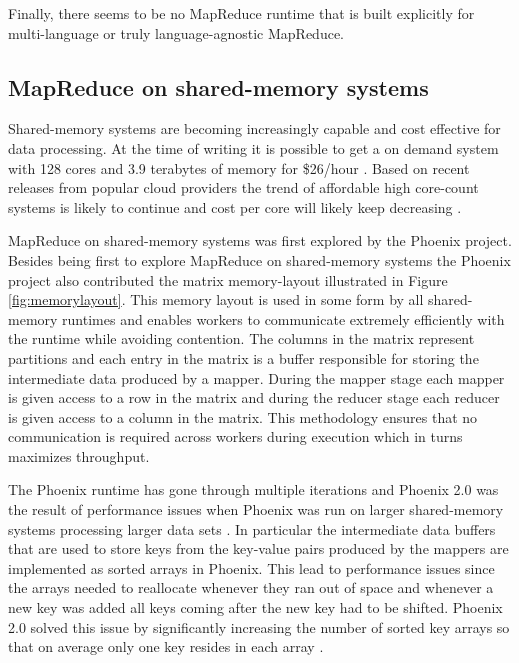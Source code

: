 \documentclass[11pt]{article}       %
\begin{document}
Finally, there seems to be no MapReduce runtime that is built explicitly for multi-language or truly language-agnostic MapReduce.

\subsection{MapReduce on shared-memory systems}

Shared-memory systems are becoming increasingly capable and cost effective for
data processing. At the time of writing it is possible to get a on demand
system with 128 cores and 3.9 terabytes of memory for \$26/hour \cite{AWS}.
Based on recent releases from popular cloud providers the trend of affordable
high core-count systems is likely to continue and cost per core will likely
keep decreasing \cite{AWS} \cite{GoogleCloud}.



MapReduce on shared-memory systems was first explored by the Phoenix \cite{Phoenix} project.
Besides being first to explore MapReduce on shared-memory systems the Phoenix project also contributed the matrix memory-layout illustrated in Figure \ref{fig:memorylayout}.
This memory layout is used in some form by all shared-memory runtimes \cite{Phoenix} \cite{Phoenix++} \cite{CilkMR} \cite{Metis} \cite{Ostrich} and enables workers to communicate
extremely efficiently with the runtime while avoiding contention.
The columns in the matrix represent partitions and each entry in the matrix is a buffer responsible for storing the intermediate data produced by a mapper.
During the mapper stage each mapper is given access to a row in the matrix and during the reducer stage each reducer is given access to a column in the matrix.
This methodology ensures that no communication is required across workers during execution which in turns maximizes throughput.

The Phoenix runtime has gone through multiple iterations and Phoenix 2.0 was the result of performance issues when Phoenix was run on larger shared-memory systems processing larger data sets \cite{Phoenix2}.
In particular the intermediate data buffers that are used to store keys from the key-value pairs produced by the mappers are implemented as sorted arrays in Phoenix.
This lead to performance issues since the arrays needed to reallocate whenever they ran out of space and whenever a new key was added all keys coming after the new key had to be shifted.
Phoenix 2.0 solved this issue by significantly increasing the number of sorted key arrays so that on average only one key resides in each array \cite{Phoenix2}.
\end{document}
